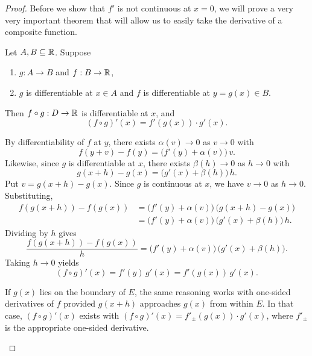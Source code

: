 \begin{problem}
\begin{proof}
    Before we show that $f'$  is not continuous at $x = 0$, we will prove a very 
    very important theorem that will allow us to easily take the derivative
    of a composite function.

    \begin{theorem}
      \label{thm:chain-rule}
      Let $A, B \subseteq \mathbb{R}$. Suppose
      \begin{enumerate}[label=(\alph*)]
        \item $g : A \to B$ and $f : B \to \mathbb{R}$,
        \item $g$ is differentiable at $x \in A$ and $f$ is differentiable at $y = g(x) \in B$.
      \end{enumerate}
      Then $f \circ g : D \to \mathbb{R}$ is differentiable at $x$, and
      \[
        (f \circ g)'(x) = f'(g(x)) \cdot g'(x).
      \]
    \end{theorem}

    \begin{subproof}
      By differentiability of $f$ at $y$, there exists $\alpha(v) \to 0$ as $v \to 0$ with
      \[
        f(y+v) - f(y) = \bigl( f'(y) + \alpha(v) \bigr)\, v.
      \]
      Likewise, since $g$ is differentiable at $x$, there exists $\beta(h) \to 0$ as $h \to 0$ with
      \[
        g(x+h) - g(x) = \bigl( g'(x) + \beta(h) \bigr)\, h.
      \]
      Put $v = g(x+h) - g(x)$. Since $g$ is continuous at $x$, we have $v \to 0$ as $h \to 0$. Substituting,
      \begin{align*}
        f(g(x+h)) - f(g(x))
        &= \bigl( f'(y) + \alpha(v) \bigr)\, \bigl( g(x+h) - g(x) \bigr) \\
        &= \bigl( f'(y) + \alpha(v) \bigr)\, \bigl( g'(x) + \beta(h) \bigr)\, h.
      \end{align*}
      Dividing by $h$ gives
      \[
        \frac{f(g(x+h)) - f(g(x))}{h} = \bigl( f'(y) + \alpha(v) \bigr)\, \bigl( g'(x) + \beta(h) \bigr).
      \]
      Taking $h \to 0$ yields
      \[
        (f \circ g)'(x) = f'(y)\, g'(x) = f'(g(x))\, g'(x).
      \]
    \end{subproof}

    \begin{callout}
      If $g(x)$ lies on the boundary of $E$, the same reasoning works with
      one-sided derivatives of $f$ provided $g(x+h)$ approaches $g(x)$ from
      within $E$. In that case, $(f \circ g)'(x)$ exists with
      $(f \circ g)'(x) = f'_\pm(g(x)) \cdot g'(x)$, where $f'_\pm$ is the
      appropriate one-sided derivative.
    \end{callout}


\end{proof}
\end{problem}

